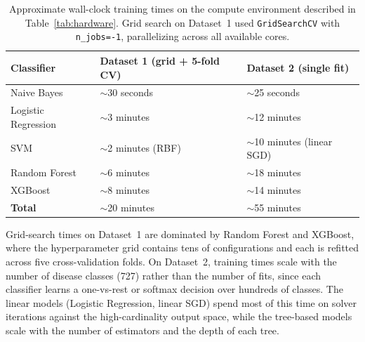\begin{table}[H]
\centering
\caption{Approximate wall-clock training times on the compute environment described in Table~\ref{tab:hardware}. Grid search on Dataset~1 used \texttt{GridSearchCV} with \texttt{n\_jobs=-1}, parallelizing across all available cores.}
\label{tab:training_times}
\begin{tabular}{@{}lll@{}}
\toprule
\textbf{Classifier} & \textbf{Dataset 1} (grid + 5-fold CV) & \textbf{Dataset 2} (single fit) \\
\midrule
Naive Bayes         & $\sim$30 seconds & $\sim$25 seconds \\
Logistic Regression & $\sim$3 minutes  & $\sim$12 minutes \\
SVM                 & $\sim$2 minutes (RBF) & $\sim$10 minutes (linear SGD) \\
Random Forest       & $\sim$6 minutes  & $\sim$18 minutes \\
XGBoost             & $\sim$8 minutes  & $\sim$14 minutes \\
\midrule
\textbf{Total}      & $\sim$20 minutes & $\sim$55 minutes \\
\bottomrule
\end{tabular}
\end{table}

Grid-search times on Dataset~1 are dominated by Random Forest and XGBoost, where the hyperparameter grid contains tens of configurations and each is refitted across five cross-validation folds. On Dataset~2, training times scale with the number of disease classes (727) rather than the number of fits, since each classifier learns a one-vs-rest or softmax decision over hundreds of classes. The linear models (Logistic Regression, linear SGD) spend most of this time on solver iterations against the high-cardinality output space, while the tree-based models scale with the number of estimators and the depth of each tree.

